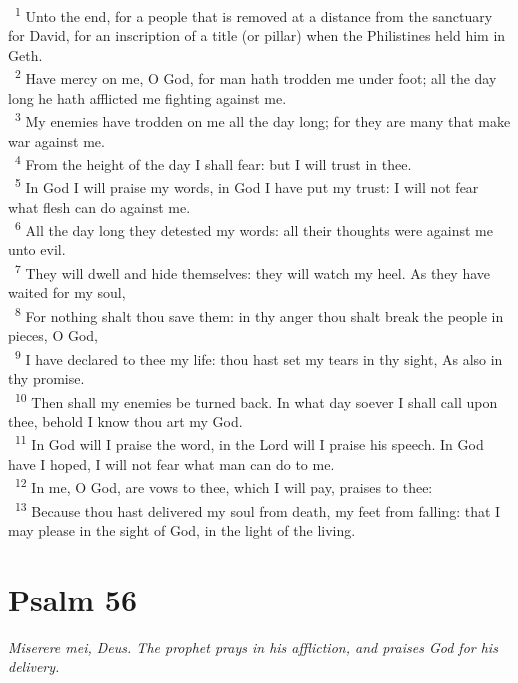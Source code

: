 \documentclass[a5paper,12pt]{article}
\begin{document}
\begin{multicols*}{2}
~\textsuperscript{1} Unto the end, for a people that is removed at a distance from the sanctuary for David, for an inscription of a title (or pillar) when the Philistines held him in Geth.\\
~\textsuperscript{2} Have mercy on me, O God, for man hath trodden me under foot; all the day long he hath afflicted me fighting against me.\\
~\textsuperscript{3} My enemies have trodden on me all the day long; for they are many that make war against me.\\
~\textsuperscript{4} From the height of the day I shall fear: but I will trust in thee.\\
~\textsuperscript{5} In God I will praise my words, in God I have put my trust: I will not fear what flesh can do against me.\\
~\textsuperscript{6} All the day long they detested my words: all their thoughts were against me unto evil.\\
~\textsuperscript{7} They will dwell and hide themselves: they will watch my heel. As they have waited for my soul,\\
~\textsuperscript{8} For nothing shalt thou save them: in thy anger thou shalt break the people in pieces, O God,\\
~\textsuperscript{9} I have declared to thee my life: thou hast set my tears in thy sight, As also in thy promise.\\
~\textsuperscript{10} Then shall my enemies be turned back. In what day soever I shall call upon thee, behold I know thou art my God.\\
~\textsuperscript{11} In God will I praise the word, in the Lord will I praise his speech. In God have I hoped, I will not fear what man can do to me.\\
~\textsuperscript{12} In me, O God, are vows to thee, which I will pay, praises to thee:\\
~\textsuperscript{13} Because thou hast delivered my soul from death, my feet from falling: that I may please in the sight of God, in the light of the living.\\

\section{Psalm 56}
\label{sec:orgac9db55}
\emph{Miserere mei, Deus. The prophet prays in his affliction, and praises God for his delivery.}\\


\end{multicols*}
\end{document}
